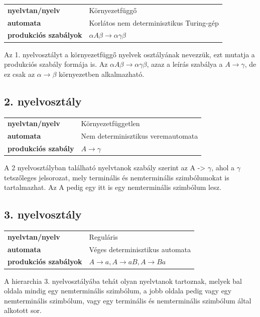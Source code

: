 \begin{tabular}{ll}
\textbf{nyelvtan/nyelv} & Környezetfüggő \\
\textbf{automata} & Korlátos nem determinisztikus Turing-gép \\
\textbf{produkciós szabályok} & $\alpha A \beta \rightarrow \alpha \gamma \beta$ \\
\end{tabular}

\medskip

Az 1. nyelvosztályt a környezetfüggő nyelvek osztályának nevezzük, ezt mutatja a produkciós szabály formája is.
Az $\alpha A \beta \rightarrow \alpha \gamma \beta$, azaz a leírás szabálya a $A \rightarrow \gamma$, de ez csak az $\alpha \rightarrow \beta$ környezetben alkalmazható.

\subsection*{2. nyelvosztály}

\begin{tabular}{ll}
\textbf{nyelvtan/nyelv} & Környezetfüggetlen \\
\textbf{automata} & Nem determinisztikus veremautomata \\
\textbf{produkciós szabály} & $A \rightarrow \gamma$ \\
\end{tabular}

\medskip

A 2 nyelvosztályban található nyelvtanok szabály szerint az A -> $\gamma$, ahol a $\gamma$ tetszőleges jelsorozat, mely terminális és nemterminális szimbólumokat is tartalmazhat. Az A pedig egy itt is egy nemterminális szimbólum lesz.

\subsection*{3. nyelvosztály}

\begin{tabular}{ll}
\textbf{nyelvtan/nyelv} & Reguláris \\
\textbf{automata} & Véges determinisztikus automata \\
\textbf{produkciós szabályok} & $A \rightarrow a, A \rightarrow aB, A \rightarrow Ba$ \\
\end{tabular}

\medskip

A hierarchia 3. nyelvosztályába tehát olyan nyelvtanok tartoznak, melyek bal oldala mindig egy nemterminális szimbólum, a jobb oldala pedig vagy egy nemterminális szimbólum, vagy egy terminális és nemterminális szimbólum által alkotott sor.

